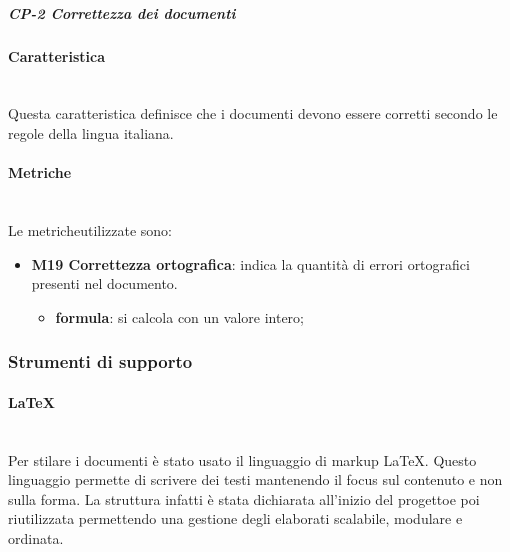 		          \subparagraph{CP-2 Correttezza dei documenti}
		          \paragraph*{Caratteristica}\mbox{}\\ [1mm]
		          Questa caratteristica definisce che i documenti devono essere corretti secondo le regole della lingua italiana.
		          \paragraph*{Metriche}\mbox{}\\ [1mm]
		          Le metriche\glosp utilizzate sono:   
		          \begin{itemize}
		          	  \item \textbf{M19 Correttezza ortografica}: indica la quantità di errori ortografici presenti nel documento.
		          	  \begin{itemize}
		          	  	\item[] \textbf{formula}: si calcola con un valore intero;
		          	  \end{itemize}
   		          \end{itemize}
        \subsubsection{Strumenti di supporto}
            \paragraph{\LaTeX}\mbox{}\\ [1mm]
                Per stilare i documenti è stato usato il linguaggio di markup \LaTeX \xspace. Questo linguaggio permette di scrivere dei testi mantenendo il focus
                sul contenuto e non sulla forma. La struttura infatti è stata dichiarata all'inizio del progetto\glosp e poi riutilizzata permettendo una gestione degli elaborati scalabile, modulare e ordinata.
